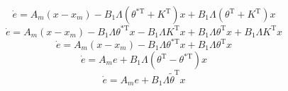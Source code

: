 \begin{equation*}
  \dot{e}=A_{m}(x-x_{m})-B_{1}\Lambda(\theta^{*\text{T}}+K^{\text{T}})x+B_{1}\Lambda (\theta^{\text{T}}+K^{\text{T}})x
\end{equation*}
\begin{equation*}
  \dot{e}=A_{m}(x-x_{m})-B_{1}\Lambda\theta^{*\text{T}}x-B_{1}\Lambda K^{\text{T}}x+B_{1}\Lambda\theta^{\text{T}}x+B_{1}\Lambda K^{\text{T}}x
\end{equation*}
\begin{equation*}
  \dot{e}=A_{m}(x-x_{m})-B_{1}\Lambda\theta^{*\text{T}}x+B_{1}\Lambda\theta^{\text{T}}x
\end{equation*}
\begin{equation*}
  \dot{e}=A_{m}e+B_{1}\Lambda(\theta^{\text{T}}-\theta^{*\text{T}})x
\end{equation*}
\begin{equation}\label{eqn.adaptive.edotfin_eqn}
  \dot{e}=A_{m}e+B_{1}\Lambda\tilde{\theta}^{\text{T}}x
\end{equation}

